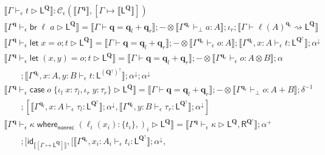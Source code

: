 \documentclass[acmsmall,screen,review]{acmart}
\newcommand{\mc}[1]{\ensuremath{\mathcal{#1}}}
\newcommand{\mb}[1]{\ensuremath{\mathbf{#1}}}
\newcommand{\ms}[1]{\ensuremath{\mathsf{#1}}}
\newcommand{\lto}{:}
\newcommand{\linl}[1]{\iota_l\;{#1}}
\newcommand{\linr}[1]{\iota_r\;{#1}}
\newcommand{\letstmt}[3]{\ensuremath{\ms{let}\;#1 = #2; #3}}
\newcommand{\brb}[2]{\ms{br}\;#1\;#2}
\newcommand{\casestmt}[5]{\ms{case}\;#1\;\{\linl{#2} \lto #3, \linr{#4} \lto #5\}}
\newcommand{\awhere}[2]{#1\;\ms{where}_{\ms{nonrec}}\;#2}
\newcommand{\wbranch}[3]{#1(#2) \lto \{#3\}}
\newcommand{\qsp}[4]{#1 \vdash #2 = #3 + #4}
\newcommand{\lwk}[3]{#1 \vdash #2 \rightsquigarrow #3}
\newcommand{\lhyp}[2]{#1(#2)}
\newcommand{\hasty}[4]{#1 \vdash_{#2} #3: {#4}}
\newcommand{\haslb}[4]{#1 \vdash_{#2} #3 \rhd #4}
\newcommand{\ltoty}[2]{[#1 \mapsto #2]}
\newcommand{\dnt}[1]{\llbracket{#1}\rrbracket}
\newcommand{\zeroqv}[1]{#1^\uparrow}
\begin{document}
\begin{figure}
  \begin{adjustbox}{minipage=1.1\textwidth,scale=0.9}
  \begin{gather*}
    \boxed{\dnt{\haslb{\Gamma}{\epsilon}{t}{\ms{L}^{\mb{Q}}}}
    : \mc{C}_\epsilon(\dnt{\Gamma^{\mb{q}}}, \ltoty{\Gamma}{\dnt{\ms{L}^{\mb{Q}}}})} \\
    \dnt
    {\haslb{\Gamma^{\mb{q}}}{\epsilon}{\brb{\ell}{a}}{\ms{L}^{\mb{Q}}}}
    = \dnt{\qsp{\Gamma}{\mb{q}}{\mb{q}_l}{\mb{q}_r}}
    ; - \otimes \dnt{\hasty{\Gamma^{\mb{q}_r}}{\bot}{a}{A}}
    ; \iota_r
    ; \dnt{\lwk{\Gamma}{\lhyp{\ell}{A}^{\mb{q}_l}}{\ms{L}^{\mb{Q}}}}
    \\
    \dnt
    {\haslb{\Gamma^{\mb{q}}}{\epsilon}{\letstmt{x}{o}{t}}{\ms{L}^{\mb{Q}}}}
    =
    \dnt{\qsp{\Gamma}{\mb{q}}{\mb{q}_l}{\mb{q}_r}}
    ; - \otimes \dnt{\hasty{\Gamma^{\mb{q}_r}}{\epsilon}{o}{A}}
    ; \dnt{\hasty{\Gamma^{\mb{q}_l}, x : A}{\epsilon}{t}{\ms{L}^{\zeroqv{\mb{Q}}}}}
    ; \alpha^\downarrow \\
    \dnt
    {\haslb{\Gamma^{\mb{q}}}{\epsilon}{\letstmt{(x, y)}{o}{t}}{\ms{L}^{\mb{Q}}}}
    =
    \dnt{\qsp{\Gamma}{\mb{q}}{\mb{q}_l}{\mb{q}_r}}
    ; - \otimes \dnt{\hasty{\Gamma^{\mb{q}_r}}{\epsilon}{o}{A \otimes B}}
    ; \alpha
    \\
    \qquad 
    ; \dnt{\hasty{\Gamma^{\mb{q}_l}, x : A, y : B}{\epsilon}{t}
      {\ms{L}^{\zeroqv{(\zeroqv{\mb{Q}})}}}}
    ; \alpha^\downarrow ; \alpha^\downarrow
    \\
    \dnt
    {\haslb{\Gamma^{\mb{q}}}{\epsilon}{\casestmt{o}{x}{\tau_l}{y}{\tau_r}}
      {\ms{L}^{\mb{Q}}}}
    = \dnt{\qsp{\Gamma}{\mb{q}}{\mb{q}_l}{\mb{q}_r}}
    ; - \otimes \dnt{\hasty{\Gamma^{\mb{q}_r}}{\bot}{o}{A + B}}
    ; \delta^{-1}
    \\
    \qquad
    ; [
      \dnt{\hasty{\Gamma^{\mb{q}_l}, x : A}{\epsilon}{\tau_l}{\ms{L}^{\zeroqv{\mb{Q}}}}}
        ; \alpha^\downarrow,
      \dnt{\hasty{\Gamma^{\mb{q}_l}, y : B}{\epsilon}{\tau_r}{\ms{L}^{\zeroqv{\mb{Q}}}}}
        ; \alpha^\downarrow
    ]
    \\
    \dnt
    {\haslb{\Gamma^{\mb{q}}}{\epsilon}{\awhere{\kappa}{(\wbranch{\ell_i}{x_i}{t_i},)_i}}
      {\ms{L}^{\mb{Q}}}}
    =
    \dnt{\haslb{\Gamma^{\mb{q}}}{\epsilon}{\kappa}
      {\ms{L}^{\mb{Q}}, \ms{R}^{\mb{Q}'}}} ; \alpha^+
    \\ 
    \qquad ; [
      \ms{id}_{\dnt{\ltoty{\Gamma}{\ms{L}^{\mb{Q}}}}},
      [
        \dnt{\hasty{\Gamma^{\mb{q}_i}, x_i : A_i}{\epsilon}{t_i}
          {\ms{L}^{\zeroqv{\mb{Q}}}}} ; \alpha^\downarrow,

\end{gather*}
\end{adjustbox}
\end{figure}
\end{document}
